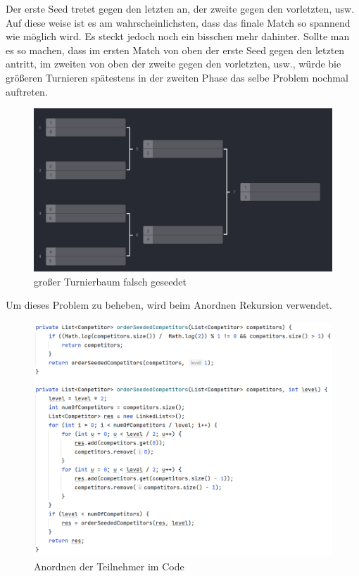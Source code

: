 Der erste Seed tretet gegen den letzten an, der zweite gegen den vorletzten, usw. Auf diese weise ist es am wahrscheinlichsten, dass das finale Match so spannend wie möglich wird. 
Es steckt jedoch noch ein bisschen mehr dahinter. Sollte man es so machen, dass im ersten Match von oben der erste Seed gegen den letzten antritt, im zweiten von oben der zweite gegen den vorletzten, usw., 
würde bie größeren Turnieren spätestens in der zweiten Phase das selbe Problem nochmal auftreten.

\begin{figure}[H]
    \includegraphics[scale=0.25]{pics/backend/elimination/elimination_tree_seeded_wrong_big.png}
    \caption{großer Turnierbaum falsch geseedet\cite{implementation-execution-1}}
\end{figure}

Um dieses Problem zu beheben, wird beim Anordnen Rekursion verwendet.

\begin{figure}[H]
    \includegraphics[scale=0.5]{pics/backend/elimination/elimination_orderSeededCompetitors.png}
    \caption{Anordnen der Teilnehmer im Code}
\end{figure}

